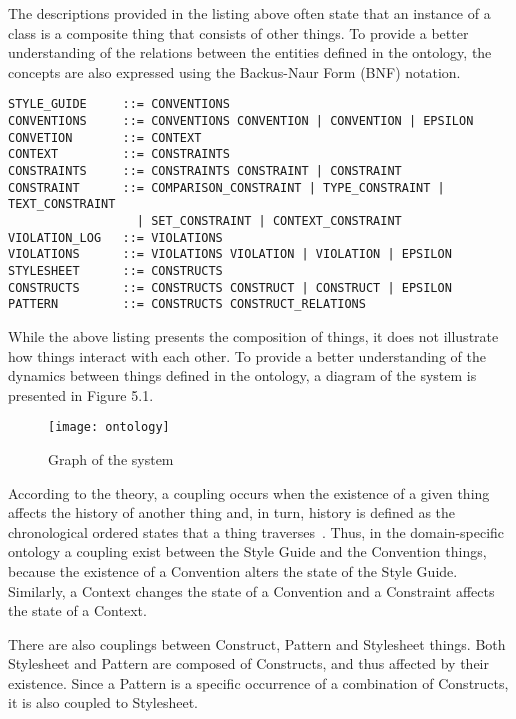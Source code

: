 \documentclass[parskip=full]{uvamscse}
\begin{document}
The descriptions provided in the listing above often state that an instance of a class is a composite thing that consists of other things. To provide a better understanding of the relations between the entities defined in the ontology, the concepts are also expressed using the Backus-Naur Form (BNF) notation.

\begin{snippet}
\begin{verbatim}
STYLE_GUIDE     ::= CONVENTIONS
CONVENTIONS     ::= CONVENTIONS CONVENTION | CONVENTION | EPSILON
CONVETION       ::= CONTEXT
CONTEXT         ::= CONSTRAINTS
CONSTRAINTS     ::= CONSTRAINTS CONSTRAINT | CONSTRAINT
CONSTRAINT      ::= COMPARISON_CONSTRAINT | TYPE_CONSTRAINT | TEXT_CONSTRAINT 
                  | SET_CONSTRAINT | CONTEXT_CONSTRAINT 
VIOLATION_LOG   ::= VIOLATIONS
VIOLATIONS      ::= VIOLATIONS VIOLATION | VIOLATION | EPSILON
STYLESHEET      ::= CONSTRUCTS
CONSTRUCTS      ::= CONSTRUCTS CONSTRUCT | CONSTRUCT | EPSILON
PATTERN         ::= CONSTRUCTS CONSTRUCT_RELATIONS
\end{verbatim}
\end{snippet}

While the above listing presents the composition of things, it does not illustrate how things interact with each other. To provide a better understanding of the dynamics between things defined in the ontology, a diagram of the system is presented in Figure 5.1.

\begin{figure}[h!]
  \centering
  \caption{Graph of the system}
  \texttt{[image: ontology]}
\end{figure}

According to the theory, a coupling occurs when the existence of a given thing affects the history of another thing and, in turn, history is defined as the chronological ordered states that a thing traverses~\cite{wand1990ontological}. Thus, in the domain-specific ontology a coupling exist between the Style Guide and the Convention things, because the existence of a Convention alters the state of the Style Guide. Similarly, a Context changes the state of a Convention and a Constraint affects the state of a Context. 

There are also couplings between Construct, Pattern and Stylesheet things. Both Stylesheet and Pattern are composed of Constructs, and thus affected by their existence. Since a Pattern is a specific occurrence of a combination of Constructs, it is also coupled to Stylesheet.
\end{document}
